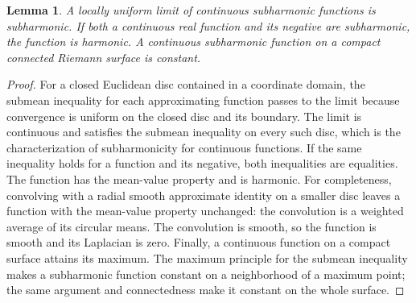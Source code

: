 \documentclass[11pt,a4paper]{article}
\numberwithin{equation}{section}
\newtheorem{lemma}[theorem]{Lemma}
\theoremstyle{definition}
\theoremstyle{remark}
\begin{document}
\begin{lemma}\label{pre:subharmonic-limits}
A locally uniform limit of continuous subharmonic functions is
subharmonic. If both a continuous real function and its negative are
subharmonic, the function is harmonic. A continuous subharmonic function
on a compact connected Riemann surface is constant.
\end{lemma}
\begin{proof}
For a closed Euclidean disc contained in a coordinate domain, the
submean inequality for each approximating function passes to the limit
because convergence is uniform on the closed disc and its boundary.
The limit is continuous and satisfies the submean inequality on every
such disc, which is the characterization of subharmonicity for continuous
functions. If the same inequality holds for a function and its negative,
both inequalities are equalities. The function has the mean-value
property and is harmonic. For completeness, convolving with a radial
smooth approximate identity on a smaller disc leaves a function with
the mean-value property unchanged: the convolution is a weighted average
of its circular means. The convolution is smooth, so the function is
smooth and its Laplacian is zero. Finally, a continuous function on a
compact surface attains its maximum. The maximum principle for the
submean inequality makes a subharmonic function constant on a
neighborhood of a maximum point; the same argument and connectedness
make it constant on the whole surface.
\end{proof}
\end{document}
